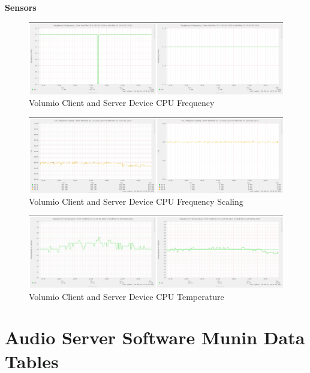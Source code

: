\documentclass[11pt,a4paper,headinclude=false,footinclude=false]{scrreprt}
\begin{document}
\textbf{Sensors}

\begin{figure}[H]
\includegraphics{ResultsAndAnalysis/VolumioServerTestImages/001VolumioCPUFreq.png}
\centering
\caption{Volumio Client and Server Device CPU Frequency}
\label{VolumioCPUFreq}
\end{figure}

\begin{figure}[H]
\includegraphics{ResultsAndAnalysis/VolumioServerTestImages/002VolumioCPUFreqScaling.png}
\centering
\caption{Volumio Client and Server Device CPU Frequency Scaling}
\label{VolumioCPUFreqScaling}
\end{figure}

\begin{figure}[H]
\includegraphics{ResultsAndAnalysis/VolumioServerTestImages/003VolumioCPUTemp.png}
\centering
\caption{Volumio Client and Server Device CPU Temperature}
\label{VolumioCPUTemp}
\end{figure}

\section{\texorpdfstring{Audio Server Software Munin Data Tables
\label{AppendicesAudioServerSoftwareTables}}{Audio Server Software Munin Data Tables }}\label{audio-server-software-munin-data-tables}
\end{document}
